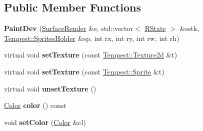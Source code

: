 \subsection*{Public Member Functions}
\begin{DoxyCompactItemize}
\item 
\hypertarget{struct_tempest_1_1_surface_render_1_1_paint_dev_a2869576adb8cd1daef516ded781e0124}{{\bfseries Paint\+Dev} (\hyperlink{class_tempest_1_1_surface_render}{Surface\+Render} \&s, std\+::vector$<$ \hyperlink{struct_tempest_1_1_surface_render_1_1_r_state}{R\+State} $>$ \&sstk, \hyperlink{class_tempest_1_1_sprites_holder}{Tempest\+::\+Sprites\+Holder} \&sp, int rx, int ry, int rw, int rh)}\label{struct_tempest_1_1_surface_render_1_1_paint_dev_a2869576adb8cd1daef516ded781e0124}

\item 
\hypertarget{struct_tempest_1_1_surface_render_1_1_paint_dev_aae9964934aee58836d9eeb33cc458435}{virtual void {\bfseries set\+Texture} (const \hyperlink{class_tempest_1_1_texture2d}{Tempest\+::\+Texture2d} \&t)}\label{struct_tempest_1_1_surface_render_1_1_paint_dev_aae9964934aee58836d9eeb33cc458435}

\item 
\hypertarget{struct_tempest_1_1_surface_render_1_1_paint_dev_a5d6db8c238344bf68625b3fba269a281}{virtual void {\bfseries set\+Texture} (const \hyperlink{class_tempest_1_1_sprite}{Tempest\+::\+Sprite} \&t)}\label{struct_tempest_1_1_surface_render_1_1_paint_dev_a5d6db8c238344bf68625b3fba269a281}

\item 
\hypertarget{struct_tempest_1_1_surface_render_1_1_paint_dev_a1a7c68817f738aa3ff5ec966a22289e1}{virtual void {\bfseries unset\+Texture} ()}\label{struct_tempest_1_1_surface_render_1_1_paint_dev_a1a7c68817f738aa3ff5ec966a22289e1}

\item 
\hypertarget{struct_tempest_1_1_surface_render_1_1_paint_dev_a0030de9a9296c56109fd26632a539473}{\hyperlink{class_tempest_1_1_color}{Color} {\bfseries color} () const }\label{struct_tempest_1_1_surface_render_1_1_paint_dev_a0030de9a9296c56109fd26632a539473}

\item 
\hypertarget{struct_tempest_1_1_surface_render_1_1_paint_dev_a5ae7c978cf8589149179e895e17de187}{void {\bfseries set\+Color} (\hyperlink{class_tempest_1_1_color}{Color} \&cl)}\label{struct_tempest_1_1_surface_render_1_1_paint_dev_a5ae7c978cf8589149179e895e17de187}


\end{DoxyCompactItemize}
